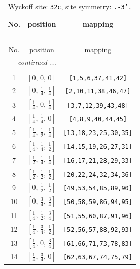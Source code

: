 \documentclass[fleqn,8pt]{jsarticle}
\begin{document}
\begin{longtable}{ccc}
\caption{Wyckoff site: {\tt 32c}, site symmetry: {\tt .-3'.}}
 \\
 \hline \hline
No. & position & mapping \\ \hline \endfirsthead

\multicolumn{2}{l}{\tablename\ \thetable{}} \\
 \hline \hline
No. & position & mapping \\ \hline \endhead

 \hline \hline
\multicolumn{2}{r}{\footnotesize\it continued ...} \\ \endfoot

 \hline \hline
\multicolumn{2}{r}{} \\ \endlastfoot

1 & $\left[ 0,\, 0,\, 0 \right]$ & {\tt [1,5,6,37,41,42]} \\ \hline
2 & $\left[ 0,\, \frac{1}{4},\, \frac{1}{4} \right]$ & {\tt [2,10,11,38,46,47]} \\ \hline
3 & $\left[ \frac{1}{4},\, 0,\, \frac{1}{4} \right]$ & {\tt [3,7,12,39,43,48]} \\ \hline
4 & $\left[ \frac{1}{4},\, \frac{1}{4},\, 0 \right]$ & {\tt [4,8,9,40,44,45]} \\ \hline
5 & $\left[ \frac{1}{4},\, \frac{1}{2},\, \frac{1}{4} \right]$ & {\tt [13,18,23,25,30,35]} \\ \hline
6 & $\left[ \frac{1}{4},\, \frac{1}{4},\, \frac{1}{2} \right]$ & {\tt [14,15,19,26,27,31]} \\ \hline
7 & $\left[ \frac{1}{2},\, \frac{1}{4},\, \frac{1}{4} \right]$ & {\tt [16,17,21,28,29,33]} \\ \hline
8 & $\left[ \frac{1}{2},\, \frac{1}{2},\, \frac{1}{2} \right]$ & {\tt [20,22,24,32,34,36]} \\ \hline
9 & $\left[ 0,\, \frac{1}{2},\, \frac{1}{2} \right]$ & {\tt [49,53,54,85,89,90]} \\ \hline
10 & $\left[ 0,\, \frac{3}{4},\, \frac{3}{4} \right]$ & {\tt [50,58,59,86,94,95]} \\ \hline
11 & $\left[ \frac{1}{4},\, \frac{1}{2},\, \frac{3}{4} \right]$ & {\tt [51,55,60,87,91,96]} \\ \hline
12 & $\left[ \frac{1}{4},\, \frac{3}{4},\, \frac{1}{2} \right]$ & {\tt [52,56,57,88,92,93]} \\ \hline
13 & $\left[ \frac{1}{4},\, 0,\, \frac{3}{4} \right]$ & {\tt [61,66,71,73,78,83]} \\ \hline
14 & $\left[ \frac{1}{4},\, \frac{3}{4},\, 0 \right]$ & {\tt [62,63,67,74,75,79]} \\ \hline

\end{longtable}
\end{document}
